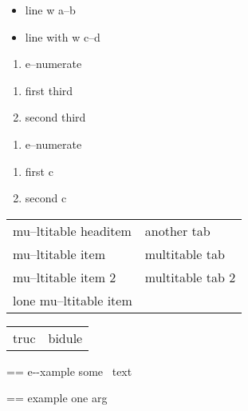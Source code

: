 \documentclass{book}
\makeatletter
\newenvironment{Texinfopreformatted}{%
  \par\GNUTobeylines\obeyspaces\frenchspacing\parskip=\z@\parindent=\z@}{}
{\catcode`\^^M=13 \gdef\GNUTobeylines{\catcode`\^^M=13 \def^^M{\null\par}}}
\newenvironment{Texinfoindented}{\begin{list}{}{}\item\relax}{\end{list}}
\renewcommand{\_}{\Texinfounderscore\discretionary{}{}{}}
\makeatother
\begin{document}
\begin{titlepage}
\begin{itemize}[label=\hbox{} on a line]
\item line w a--b
\item line with w c--d
\end{itemize}

\begin{enumerate}[start=1]
\item e--numerate
\end{enumerate}

\begin{enumerate}[start=3]
\item first third
\item second third
\end{enumerate}

\begin{enumerate}[label=\alph*.]
\item e--numerate
\end{enumerate}

\begin{enumerate}[label=\alph*.,start=3]
\item first c
\item second c
\end{enumerate}

\begin{tabular}{m{} m{}}%
mu--ltitable headitem &another tab\\
mu--ltitable item &multitable tab\\
mu--ltitable item 2 &multitable tab 2
\index[cp]{index entry within multitable@index entry within multitable}%
\\
lone mu--ltitable item&\\
\end{tabular}%

\begin{tabular}{m{} m{}}%
truc &bidule\\
\end{tabular}%

\begin{Texinfoindented}
\begin{Texinfopreformatted}%
\ttfamily e{-}{-}xample  some
\   text
\end{Texinfopreformatted}
\end{Texinfoindented}

\begin{Texinfoindented}
\begin{Texinfopreformatted}%
\ttfamily example one arg
\end{Texinfopreformatted}
\end{Texinfoindented}


\end{titlepage}
\end{document}
